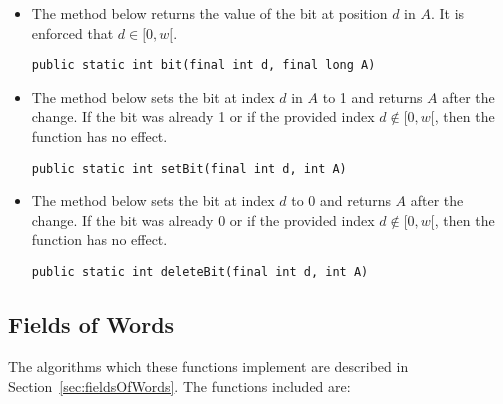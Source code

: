 \begin{itemize}
    \item
    The method below returns the value of the bit at position $d$ in $A$. It is enforced that $d \in [0, w[$.
    \begin{lstlisting}
public static int bit(final int d, final long A)
    \end{lstlisting}
    
    \item
    The method below sets the bit at index $d$ in $A$ to 1 and returns $A$ after the change. If the bit was already 1 or if the provided index $d \not\in [0, w[$, then the function has no effect.
    \begin{lstlisting}
public static int setBit(final int d, int A)
    \end{lstlisting}
    
    \item
    The method below sets the bit at index $d$ to 0 and returns $A$ after the change. If the bit was already 0 or if the provided index $d \not\in [0, w[$, then the function has no effect.
    \begin{lstlisting}
public static int deleteBit(final int d, int A)
    \end{lstlisting}
\end{itemize}

\subsection{Fields of Words}
The algorithms which these functions implement are described in Section~\ref{sec:fieldsOfWords}.
The functions included are:

